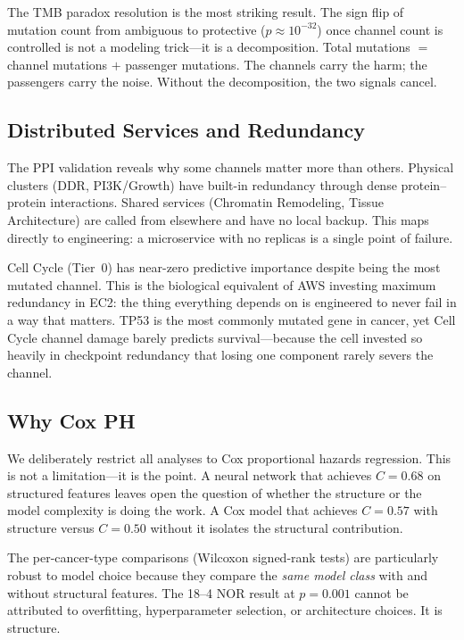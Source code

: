 \documentclass[11pt]{article}
\begin{document}
The TMB paradox resolution is the most striking result. The sign
flip of mutation count from ambiguous to protective ($p \approx
10^{-32}$) once channel count is controlled is not a modeling
trick---it is a decomposition. Total mutations $=$ channel
mutations $+$ passenger mutations. The channels carry the harm;
the passengers carry the noise. Without the decomposition, the
two signals cancel.

\subsection{Distributed Services and Redundancy}

The PPI validation reveals why some channels matter more than
others. Physical clusters (DDR, PI3K/Growth) have built-in
redundancy through dense protein--protein interactions. Shared
services (Chromatin Remodeling, Tissue Architecture) are called
from elsewhere and have no local backup. This maps directly to
engineering: a microservice with no replicas is a single point
of failure.

Cell Cycle (Tier~0) has near-zero predictive importance despite
being the most mutated channel. This is the biological equivalent
of AWS investing maximum redundancy in EC2: the thing everything
depends on is engineered to never fail in a way that matters.
TP53 is the most commonly mutated gene in cancer, yet Cell Cycle
channel damage barely predicts survival---because the cell
invested so heavily in checkpoint redundancy that losing one
component rarely severs the channel.

\subsection{Why Cox PH}

We deliberately restrict all analyses to Cox proportional hazards
regression. This is not a limitation---it is the point. A neural
network that achieves $C = 0.68$ on structured features leaves
open the question of whether the structure or the model
complexity is doing the work. A Cox model that achieves $C =
0.57$ with structure versus $C = 0.50$ without it isolates the
structural contribution.

The per-cancer-type comparisons (Wilcoxon signed-rank tests) are
particularly robust to model choice because they compare the
\emph{same model class} with and without structural features.
The 18--4 NOR result at $p = 0.001$ cannot be attributed to
overfitting, hyperparameter selection, or architecture choices.
It is structure.
\end{document}

